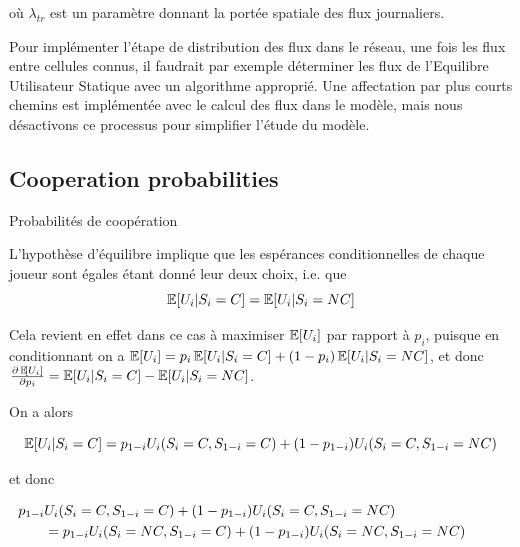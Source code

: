 où $\lambda_{tr}$ est un paramètre donnant la portée spatiale des flux journaliers.

Pour implémenter l'étape de distribution des flux dans le réseau, une fois les flux entre cellules connus, il faudrait par exemple déterminer les flux de l'Equilibre Utilisateur Statique avec un algorithme approprié. Une affectation par plus courts chemins est implémentée avec le calcul des flux dans le modèle, mais nous désactivons ce processus pour simplifier l'étude du modèle.




\subsection{Cooperation probabilities}{Probabilités de coopération}


L'hypothèse d'équilibre implique que les espérances conditionnelles de chaque joueur sont égales étant donné leur deux choix, i.e. que 
\[
\operatorname{\mathbb{E}}\!\left[U_i|S_i=C\right] = \operatorname{\mathbb{E}}\!\left[U_i|S_i=NC\right]
\] 

Cela revient en effet dans ce cas à maximiser $\operatorname{\mathbb{E}}\!\left[U_i\right]$ par rapport à $p_i$, puisque en conditionnant on a $\operatorname{\mathbb{E}}\!\left[U_i\right] = p_i \operatorname{\mathbb{E}}\!\left[U_i|S_i = C\right] + (1 - p_i) \operatorname{\mathbb{E}}\!\left[U_i|S_i = NC\right]$, et donc $\frac{\partial \operatorname{\mathbb{E}}\!\left[U_i\right]}{\partial p_i} = \operatorname{\mathbb{E}}\!\left[U_i|S_i = C\right] - \operatorname{\mathbb{E}}\!\left[U_i| S_i = NC\right]$.

On a alors

\[
\operatorname{\mathbb{E}}\!\left[U_i|S_i=C\right] = p_{1-i} U_i(S_i=C,S_{1-i}=C) + (1- p_{1-i}) U_i (S_i=C,S_{1-i}=NC)
\]

et donc 

\begin{equation*}
\hspace{-1cm}
\begin{split}
	p_{1-i} & U_i(S_i=C,S_{1-i}=C) + (1- p_{1-i}) U_i (S_i=C,S_{1-i}=NC) \\
	& = p_{1-i} U_i(S_i=NC,S_{1-i}=C) + (1- p_{1-i}) U_i (S_i=NC,S_{1-i}=NC)
\end{split}
\end{equation*}

